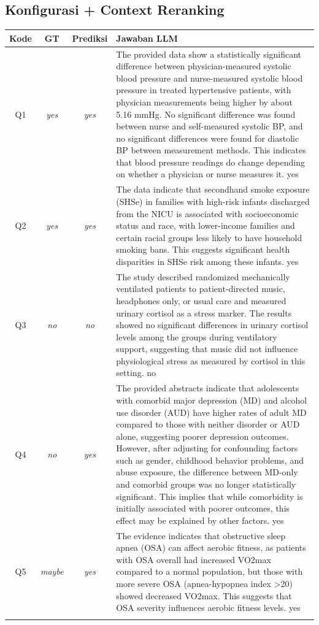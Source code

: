 \subsection*{Konfigurasi + Context Reranking}
\begin{longtable}{@{}c c c >{\raggedright\arraybackslash}p{8.8cm}@{}}
\toprule
\textbf{Kode} & \textbf{GT} & \textbf{Prediksi} & \textbf{Jawaban LLM} \\
\midrule\endhead
Q1 & \textit{yes} & \textit{yes} & The provided data show a statistically significant difference between physician-measured systolic blood pressure and nurse-measured systolic blood pressure in treated hypertensive patients, with physician measurements being higher by about 5.16 mmHg. No significant difference was found between nurse and self-measured systolic BP, and no significant differences were found for diastolic BP between measurement methods. This indicates that blood pressure readings do change depending on whether a physician or nurse measures it. yes \\
\addlinespace
Q2 & \textit{yes} & \textit{yes} & The data indicate that secondhand smoke exposure (SHSe) in families with high-risk infants discharged from the NICU is associated with socioeconomic status and race, with lower-income families and certain racial groups less likely to have household smoking bans. This suggests significant health disparities in SHSe risk among these infants. yes \\
\addlinespace
Q3 & \textit{no} & \textit{no} & The study described randomized mechanically ventilated patients to patient-directed music, headphones only, or usual care and measured urinary cortisol as a stress marker. The results showed no significant differences in urinary cortisol levels among the groups during ventilatory support, suggesting that music did not influence physiological stress as measured by cortisol in this setting. no \\
\addlinespace
Q4 & \textit{no} & \textit{yes} & The provided abstracts indicate that adolescents with comorbid major depression (MD) and alcohol use disorder (AUD) have higher rates of adult MD compared to those with neither disorder or AUD alone, suggesting poorer depression outcomes. However, after adjusting for confounding factors such as gender, childhood behavior problems, and abuse exposure, the difference between MD-only and comorbid groups was no longer statistically significant. This implies that while comorbidity is initially associated with poorer outcomes, this effect may be explained by other factors. yes \\
\addlinespace
Q5 & \textit{maybe} & \textit{yes} & The evidence indicates that obstructive sleep apnea (OSA) can affect aerobic fitness, as patients with OSA overall had increased VO2max compared to a normal population, but those with more severe OSA (apnea-hypopnea index >20) showed decreased VO2max. This suggests that OSA severity influences aerobic fitness levels. yes \\
\addlinespace
\bottomrule
\end{longtable}

